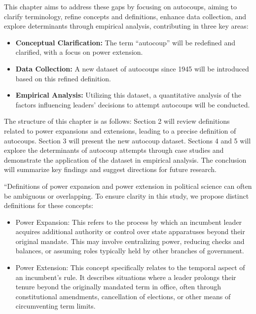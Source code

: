 \documentclass[
  12pt,
]{report}
\begin{document}
This chapter aims to address these gaps by focusing on autocoups, aiming
to clarify terminology, refine concepts and definitions, enhance data
collection, and explore determinants through empirical analysis,
contributing in three key areas:

\begin{itemize}
\item
  \textbf{Conceptual Clarification:} The term ``autocoup'' will be
  redefined and clarified, with a focus on power extension.
\item
  \textbf{Data Collection:} A new dataset of autocoups since 1945 will
  be introduced based on this refined definition.
\item
  \textbf{Empirical Analysis:} Utilizing this dataset, a quantitative
  analysis of the factors influencing leaders' decisions to attempt
  autocoups will be conducted.
\end{itemize}

The structure of this chapter is as follows: Section 2 will review
definitions related to power expansions and extensions, leading to a
precise definition of autocoups. Section 3 will present the new autocoup
dataset. Sections 4 and 5 will explore the determinants of autocoup
attempts through case studies and demonstrate the application of the
dataset in empirical analysis. The conclusion will summarize key
findings and suggest directions for future research.

``Definitions of power expansion and power extension in political
science can often be ambiguous or overlapping. To ensure clarity in this
study, we propose distinct definitions for these concepts:

\begin{itemize}
\item
  Power Expansion: This refers to the process by which an incumbent
  leader acquires additional authority or control over state apparatuses
  beyond their original mandate. This may involve centralizing power,
  reducing checks and balances, or assuming roles typically held by
  other branches of government.
\item
  Power Extension: This concept specifically relates to the temporal
  aspect of an incumbent's rule. It describes situations where a leader
  prolongs their tenure beyond the originally mandated term in office,
  often through constitutional amendments, cancellation of elections, or
  other means of circumventing term limits.
\end{itemize}
\end{document}
